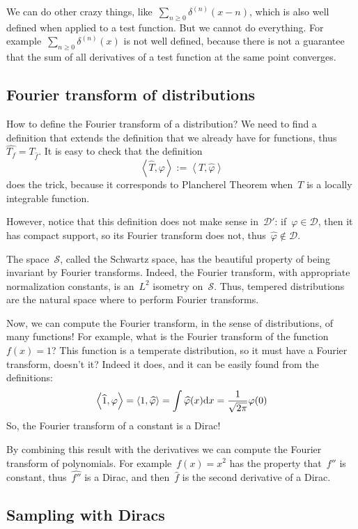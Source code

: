 We can do other crazy things, like~$\sum_{n\ge 0}\delta^{(n)}(x-n)$,
which is also well defined when applied to a test function.  But we
cannot do everything.  For example~$\sum_{n\ge 0}\delta^{(n)}(x)$ is
not well defined, because there is not a guarantee that the sum of
all derivatives of a test function at the same point converges.

\subsection{Fourier transform of distributions}

How to define the Fourier transform of a distribution?
We need to find a definition that extends the definition that we
already have for functions, thus~$\widehat{T_f}=T_{\widehat{f}}$.
It is easy to check that the definition
$$
\left<\widehat{T},\varphi\right>
:=
\left<T,\widehat{\varphi}\right>
$$
does the trick, because it corresponds to Plancherel Theorem when~$T$
is a locally integrable function.

However, notice that this definition does not make sense
in~$\mathcal{D}'$:  if~$\varphi\in\mathcal{D}$, then it has compact
support, so its Fourier transform does not,
thus~$\widehat{\varphi}\not\in\mathcal{D}$.

The space~$\mathcal{S}$, called the Schwartz space, has the beautiful
property of being invariant by Fourier transforms.  Indeed, the Fourier
transform, with appropriate normalization constants, is an~$L^2$
isometry on~$\mathcal{S}$.  Thus, tempered distributions are the
natural space where to perform Fourier transforms.

Now, we can compute the Fourier transform, in the sense of
distributions, of many functions!  For example, what is the Fourier
transform of the function~$f(x)=1$?  This function is a temperate
distribution, so it must have a Fourier transform, doesn't it?
Indeed it does, and it can be easily found from the definitions:
$$
\left<\widehat{1},\varphi\right>
=
\left<1,\widehat{\varphi}\right>
=
\int\widehat{\varphi}(x)\mathrm{d} x
=
\frac{1}{\sqrt{2\pi}}\varphi(0)
$$
So, the Fourier transform of a constant is a Dirac!

By combining this result with the derivatives we can compute the
Fourier transform of polynomials.  For example~$f(x)=x^2$ has the
property that~$f''$ is constant, thus~$\widehat{f''}$ is a Dirac, and
then~$\widehat{f}$ is the second derivative of a Dirac.


\subsection{Sampling with Diracs}


